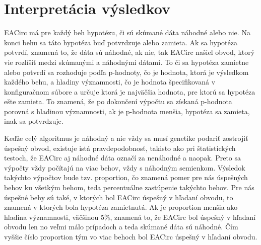 \section{Interpretácia výsledkov}
\label{sec:result-interpretation}

EACirc má pre každý beh hypotézu, či sú skúmané dáta náhodné alebo nie. Na konci behu sa táto hypotéza buď potvrdzuje alebo zamieta. Ak sa hypotéza potvrdí, znamená to, že dáta sú náhodné, ak nie, tak EACirc našiel obvod, ktorý vie rozlíšiť medzi skúmanými a náhodnými dátami. To či sa hypotéza zamietne alebo potvrdí sa rozhoduje podľa p-hodnoty, čo je hodnota, ktorá je výsledkom každého behu, a hladiny významnosti, čo je hodnota špecifikovaná v konfiguračnom súbore a určuje ktorá je najväčšia hodnota, pre ktorú sa hypotéza ešte zamieta. To znamená, že po dokončení výpočtu sa získaná p-hodnota porovná s hladinou významnosti, ak je p-hodnota menšia, hypotéza sa zamieta, inak sa potvrdzuje. 

Keďže celý algoritmus je náhodný a nie vždy sa musí genetike podariť zostrojiť úspešný obvod, existuje istá pravdepodobnosť, takisto ako pri štatistických testoch, že EACirc aj náhodné dáta označí za nenáhodné a naopak. Preto sa výpočty vždy počítajú na viac behov, vždy s náhodným semienkom. Výsledok takýchto výpočtov bude tzv. proportion, čo znamená pomer pre nás úspešných behov ku všetkým behom, teda percentuálne zastúpenie takýchto behov. Pre nás úspešné behy sú také, v ktorých bol EACirc úspešný v hľadaní obvodu, to znamená v ktorých bola hypotéza zamietnutá. Ak je proportion menšia ako hladina významnosti, väčšinou 5\%, znamená to, že EACirc bol úspešný v hľadaní obvodu len no veľmi málo prípadoch a teda skúmané dáta sú náhodné. Čím vyššie číslo proportion tým vo viac behoch bol EACirc úspešný v hľadaní obvodu. 



